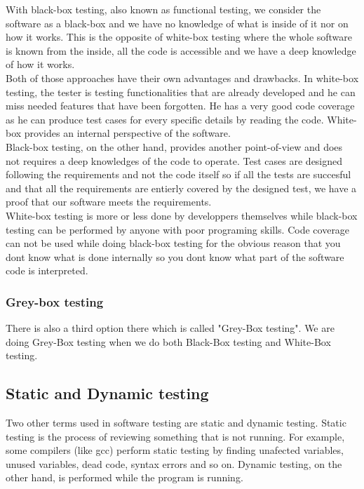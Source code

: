 \documentclass[12pt]{article}
\begin{document}
With black-box testing, also known as functional testing, we consider the software as a black-box and we have no knowledge of what is inside of it nor on how it works. This is the opposite of white-box testing where the whole software is known from the inside, all the code is accessible and we have a deep knowledge of how it works.\\

Both of those approaches have their own advantages and drawbacks. In white-box testing, the tester is testing functionalities that are already developed and he can miss needed features that have been forgotten. He has a very good code coverage as he can produce test cases for every specific details by reading the code. White-box provides an internal perspective of the software.\\

Black-box testing, on the other hand, provides another point-of-view and does not requires a deep knowledges of the code to operate. Test cases are designed following the requirements and not the code itself so if all the tests are succesful and that all the requirements are entierly covered by the designed test, we have a proof that our software meets the requirements.\\

White-box testing is more or less done by developpers themselves while black-box testing can be performed by anyone with poor programing skills. Code coverage can not be used while doing black-box testing for the obvious reason that you dont know what is done internally so you dont know what part of the software code is interpreted.

\subsubsection{Grey-box testing}

There is also a third option there which is called "Grey-Box testing". We are doing Grey-Box testing when we do both Black-Box testing and White-Box testing.

\subsection{Static and Dynamic testing}

Two other terms used in software testing are static and dynamic testing. Static testing is the process of reviewing something that is not running. For example, some compilers (like gcc) perform static testing by finding unafected variables, unused variables, dead code, syntax errors and so on. Dynamic testing, on the other hand, is performed while the program is running.
\end{document}
